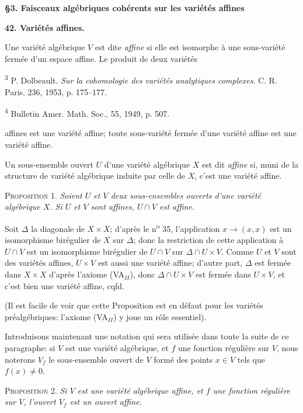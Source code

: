\textbf{§3. Faisceaux algébriques cohérents sur les variétés affines}


\textbf{42. Variétés affines.}

Une variété algébrique $V$ est dite \textit{affine} si elle est isomorphe à une sous-variété fermée d'un espace affine. Le produit de deux variétés

\textsuperscript{3} P. Dolbeault. \textit{Sur la cohomologie des variétés analytiques complexes}. C. R. Paris, 236, 1953, p. 175--177.

\textsuperscript{4} Bulletin Amer. Math. Soc., 55, 1949, p. 507.



 affines est une variété affine; toute sous-variété fermée d'une variété affine est une variété affine.

Un sous-ensemble ouvert $U$ d'une variété algébrique $X$ est dit \textit{affine} si, muni de la structure de variété algébrique induite par celle de $X$, c'est une variété affine.

\textsc{Proposition} 1. \textit{Soient $U$ et $V$ deux sous-ensembles ouverts d'une variété algébrique $X$. Si $U$ et $V$ sont affines, $U \cap V$ est affine.}

Soit $\Delta$ la diagonale de $X \times X$; d'après le n\textsuperscript{o} 35, l'application $x \rightarrow (x, x)$ est un isomorphisme birégulier de $X$ sur $\Delta$; donc la restriction de cette application à $U \cap V$ est un isomorphisme birégulier de $U \cap V$ sur $\Delta \cap U \times V$. Comme $U$ et $V$ sont des variétés affines, $U \times V$ est aussi une variété affine; d'autre part, $\Delta$ est fermée dans $X \times X$ d'après l'axiome (VA$_{II}$), donc $\Delta \cap U \times V$ est fermée dans $U \times V$, et c'est bien une variété affine, cqfd.

(Il est facile de voir que cette Proposition est en défaut pour les variétés préalgébriques: l'axiome (VA$_{II}$) y joue un rôle essentiel).

Introduisons maintenant une notation qui sera utilisée dans toute la suite de ce paragraphe: si $V$ est une variété algébrique, et $f$ une fonction régulière sur $V$, nous noterons $V_f$ le sous-ensemble ouvert de $V$ formé des points $x \in V$ tels que $f(x) \neq 0$.

\textsc{Proposition} 2. \textit{Si $V$ est une variété algébrique affine, et $f$ une fonction régulière sur $V$, l'ouvert $V_f$ est un ouvert affine.}

